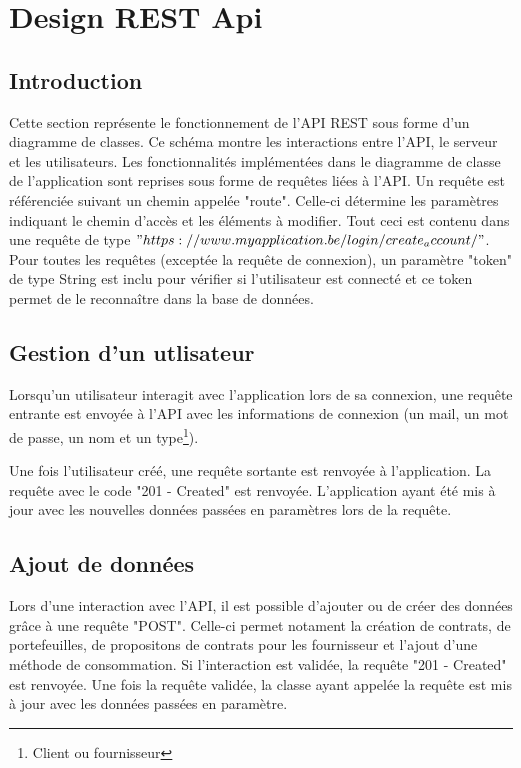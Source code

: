 \section{Design REST Api}
\subsection{Introduction}
\begin{flushleft}
Cette section représente le fonctionnement de l'API REST sous forme d'un diagramme de classes. Ce schéma montre les interactions entre l'API, le serveur et les utilisateurs. Les fonctionnalités implémentées dans le diagramme de classe de l'application sont reprises sous forme de requêtes liées à l'API.  Un requête est référenciée suivant un chemin appelée "route". Celle-ci détermine les paramètres indiquant le chemin d'accès et les éléments à modifier. Tout ceci est contenu dans une requête de type $"https://www.myapplication.be/login/create_account/"$. Pour toutes les requêtes (exceptée la requête de connexion), un paramètre "token" de type String est inclu pour vérifier si l'utilisateur est connecté et ce token permet de le reconnaître dans la base de données.
\end{flushleft}

\subsection{Gestion d'un utlisateur}
\begin{flushleft}
Lorsqu'un utilisateur interagit avec l'application lors de sa connexion, une requête entrante est envoyée à l'API avec les informations de connexion (un mail, un mot de passe, un nom et un type\footnote{Client ou fournisseur}).
\end{flushleft}

\begin{flushleft}
Une fois l'utilisateur créé, une requête sortante est renvoyée à l'application. La requête avec le code "201 - Created" est renvoyée. L'application ayant été mis à jour avec les nouvelles données passées en paramètres lors de la requête.
\end{flushleft}

\subsection{Ajout de données}
\begin{flushleft}
Lors d'une interaction avec l'API, il est possible d'ajouter ou de créer des données grâce à une requête "POST". Celle-ci permet notament la création de contrats, de portefeuilles, de propositons de contrats pour les fournisseur et l'ajout d'une méthode de consommation. Si l'interaction est validée, la requête "201 - Created" est renvoyée. Une fois la requête validée, la classe ayant appelée la requête est mis à jour avec les données passées en paramètre.
\end{flushleft}
\newpage
